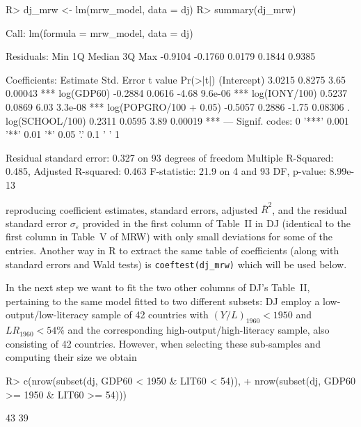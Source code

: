 \documentclass[10pt,a4paper,twoside]{article}
\let\code=\texttt
\let\pkg=\textbf
\let\proglang=\textsf
\newenvironment{Schunk}{}{}
\begin{document}
\begin{Schunk}
\begin{Sinput}
R> dj_mrw <- lm(mrw_model, data = dj)
R> summary(dj_mrw)
\end{Sinput}
\begin{Soutput}
Call:
lm(formula = mrw_model, data = dj)

Residuals:
    Min      1Q  Median      3Q     Max 
-0.9104 -0.1760  0.0179  0.1844  0.9385 

Coefficients:
                       Estimate Std. Error t value Pr(>|t|)    
(Intercept)              3.0215     0.8275    3.65  0.00043 ***
log(GDP60)              -0.2884     0.0616   -4.68  9.6e-06 ***
log(IONY/100)            0.5237     0.0869    6.03  3.3e-08 ***
log(POPGRO/100 + 0.05)  -0.5057     0.2886   -1.75  0.08306 .  
log(SCHOOL/100)          0.2311     0.0595    3.89  0.00019 ***
---
Signif. codes:  0 '***' 0.001 '**' 0.01 '*' 0.05 '.' 0.1 ' ' 1 

Residual standard error: 0.327 on 93 degrees of freedom
Multiple R-Squared: 0.485,	Adjusted R-squared: 0.463 
F-statistic: 21.9 on 4 and 93 DF,  p-value: 8.99e-13 
\end{Soutput}
\end{Schunk}

reproducing coefficient estimates, standard errors, adjusted $\bar R^2$, and the
residual standard error $\sigma_\varepsilon$ provided in the first column of Table~II in DJ
(identical to the first column in Table~V of MRW) with only small deviations for some of the
entries.  Another way in \proglang{R} to extract the same table of coefficients (along with
standard errors and Wald tests) is \code{coeftest(dj\_mrw)}
\citep[from package \pkg{lmtest}, see][]{repro:Zeileis+Hothorn:2002}
which will be used below.

In the next step we want to fit the two other columns of DJ's Table~II, pertaining to
the same model fitted to two different subsets: DJ employ a low-output/low-literacy
sample of 42 countries with $(Y/L)_{1960} < 1950$ and $\mathit{LR}_{1960} < 54\%$ and
the corresponding high-output/high-literacy sample, also consisting of 42 countries. However, when selecting
these sub-samples and computing their size we obtain

\begin{Schunk}
\begin{Sinput}
R> c(nrow(subset(dj, GDP60 <  1950 & LIT60 <  54)),
+    nrow(subset(dj, GDP60 >= 1950 & LIT60 >= 54)))
\end{Sinput}
\begin{Soutput}
[1] 43 39
\end{Soutput}
\end{Schunk}
\end{document}
